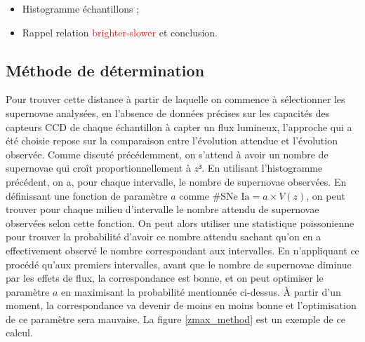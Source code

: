 \documentclass[a4paper, 12pt, svgnames]{article}
\begin{document}
\begin{itemize}
    \item Histogramme échantillons ;
    \item Rappel relation \textcolor{red}{brighter-slower} et conclusion.
\end{itemize}

\subsection{Méthode de détermination}\label{ssec:det}
Pour trouver cette distance à partir de laquelle on commence à sélectionner les
supernovae analysées, en l'absence de données précises sur les capacités des
capteurs CCD de chaque échantillon à capter un flux lumineux, l'approche qui a
été choisie repose sur la comparaison entre l'évolution attendue et l'évolution
observée. Comme discuté précédemment, on s'attend à avoir un nombre de
supernovae qui croît proportionnellement à $z³$. En utilisant l'histogramme
précédent, on a, pour chaque intervalle, le nombre de supernovae observées. En
définissant une fonction de paramètre $a$ comme $\#\text{SNe Ia} = a\times
V(z)$, on peut trouver pour chaque milieu d'intervalle le nombre attendu de
supernovae observées selon cette fonction. On peut alors utiliser une
statistique poissonienne pour trouver la probabilité d'avoir ce nombre attendu
sachant qu'on en a effectivement observé le nombre correspondant aux
intervalles. En n'appliquant ce procédé qu'aux premiers intervalles, avant que
le nombre de supernovae diminue par les effets de flux, la correspondance est
bonne, et on peut optimiser le paramètre $a$ en maximisant la probabilité
mentionnée ci-dessus. À partir d'un moment, la correspondance va devenir de
moins en moins bonne et l'optimisation de ce paramètre sera mauvaise. La figure
\ref{zmax_method} est un exemple de ce calcul.
\end{document}
